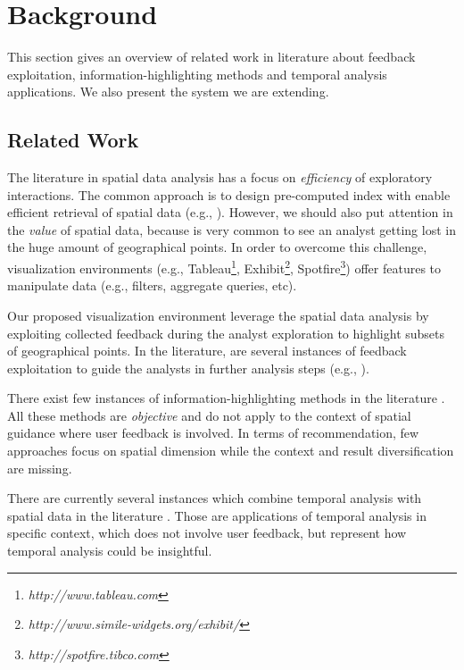 \chapter{Background}
\label{chap:background}

This section gives an overview of related work in literature about feedback exploitation, information-highlighting methods and temporal analysis applications. We also present the system we are extending.

\section{Related Work}

The literature in spatial data analysis has a focus on {\em efficiency} of exploratory interactions. The common approach is to design pre-computed index with enable efficient retrieval of spatial data (e.g., \cite{lins2013nanocubes}). However,
we should also put attention in the {\em value} of spatial data, because is very common to see an analyst getting lost in the huge amount of geographical points. In order to overcome this challenge, visualization environments (e.g., Tableau\footnote{\it http://www.tableau.com}, Exhibit\footnote{\it http://www.simile-widgets.org/exhibit/}, Spotfire\footnote{\it  http://spotfire.tibco.com}) offer features to manipulate data (e.g., filters, aggregate queries, etc).

Our proposed visualization environment leverage the spatial data analysis by exploiting collected feedback during the analyst exploration to highlight subsets of geographical points. In the literature, are several instances of feedback exploitation to guide the analysts in further analysis steps (e.g., \cite{boley2013one}).

There exist few instances of information-highlighting methods in the literature \cite{Liang2010,Robinson2011,wongsuphasawat2016voyager,willett2007scented}. All these methods are {\em objective} and do not apply to the context of spatial guidance where user feedback is involved. In terms of recommendation, few approaches focus on spatial dimension \cite{Bao2015,Levandoski:2012} while the context and result diversification are missing.

There are currently several instances which combine temporal analysis with spatial data in the literature \cite{baculo2017,balahadia2017,chidean2018,ghahramani2018,kamath2013,lopestexeira2018,ma2017,mijovic2016,tomoki2010,nara2007,zhan2017,zheng2018}. Those are applications of temporal analysis in specific context, which does not involve user feedback, but represent how temporal analysis could be insightful.

